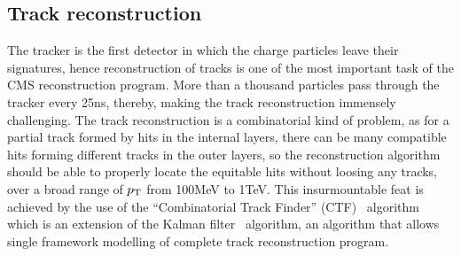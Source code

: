 \subsection{Track reconstruction}
The tracker is the first detector in which the charge particles leave their signatures, hence reconstruction of tracks is one of the most important task of
the CMS reconstruction program. More than a thousand particles pass through the tracker every 25\unit{ns}, thereby, making the track reconstruction
immensely challenging. The track reconstruction is a combinatorial kind of problem, as for a partial track formed by hits in the internal layers, there can be many
compatible hits forming different tracks in the outer layers, so the reconstruction algorithm should be able to properly locate the equitable hits without
loosing any tracks, over a broad range of $p_{\mathrm T}$ from 100\unit{MeV} to 1\unit{TeV}. This insurmountable feat is achieved by the use of the
``Combinatorial Track Finder'' (CTF)~\cite{Chatrchyan:2014fea,Adam:934067} algorithm which is an extension of the
Kalman filter~\cite{Fruhwirth:1987fm, Billoir:1989mh, Billoir:1990we} algorithm, an algorithm that allows single framework
modelling of complete track reconstruction program. 
 
